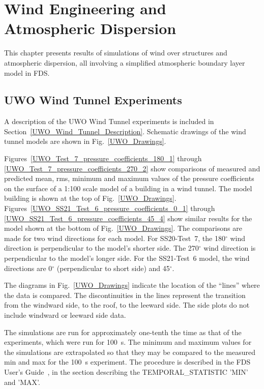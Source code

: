 
\chapter{Wind Engineering and Atmospheric Dispersion}

This chapter presents results of simulations of wind over structures and atmospheric dispersion, all involving a simplified atmospheric boundary layer model in FDS.


\section{UWO Wind Tunnel Experiments}

A description of the UWO Wind Tunnel experiments is included in Section~\ref{UWO_Wind_Tunnel_Description}. Schematic drawings of the wind tunnel models are shown in Fig.~\ref{UWO_Drawings}.

Figures~\ref{UWO_Test_7_pressure_coefficients_180_1} through \ref{UWO_Test_7_pressure_coefficients_270_2} show comparisons of measured and predicted mean, rms, minimum and maximum values of the pressure coefficients on the surface of a 1:100 scale model of a building in a wind tunnel. The model building is shown at the top of Fig.~\ref{UWO_Drawings}. Figures~\ref{UWO_SS21_Test_6_pressure_coefficients_0_1} through \ref{UWO_SS21_Test_6_pressure_coefficients_45_4} show similar results for the model shown at the bottom of Fig.~\ref{UWO_Drawings}. The comparisons are made for two wind directions for each model. For SS20-Test~7, the 180$^\circ$ wind direction is perpendicular to the model's shorter side. The 270$^\circ$ wind direction is perpendicular to the model's longer side. For the SS21-Test~6 model, the wind directions are 0$^\circ$ (perpendicular to short side) and 45$^\circ$.

The diagrams in Fig.~\ref{UWO_Drawings} indicate the location of the ``lines'' where the data is compared. The discontinuities in the lines represent the transition from the windward side, to the roof, to the leeward side. The side plots do not include windward or leeward side data.

The simulations are run for approximately one-tenth the time as that of the experiments, which were run for 100~s. The minimum and maximum values for the simulations are extrapolated so that they may be compared to the measured min and max for the 100~s experiment. The procedure is described in the FDS User's Guide~\cite{FDS_Users_Guide}, in the section describing the {\ct TEMPORAL\_STATISTIC} {\ct 'MIN'} and {\ct 'MAX'}.

